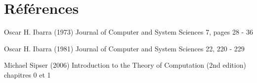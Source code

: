 \section{Références}
Oscar H. Ibarra (1973) Journal of Computer and System Sciences  7, pages 28 - 36\par
Oscar H. Ibarra (1981) Journal of Computer and System Sciences 22, 220 - 229\par
Michael Sipser (2006) Introduction to the Theory of Computation (2nd edition) chapitres 0 et 1\par